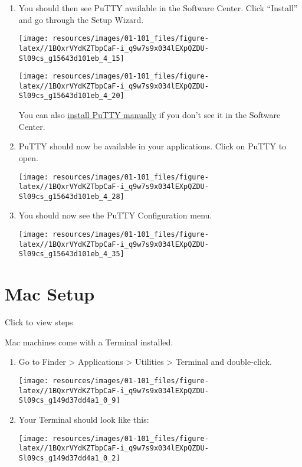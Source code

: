 \documentclass[
]{book}
\begin{document}
\begin{enumerate}
\def\labelenumi{\arabic{enumi}.}
\item
  You should then see PuTTY available in the Software Center. Click ``Install'' and go through the Setup Wizard.

  \texttt{[image: resources/images/01-101\_files/figure-latex//1BQxrVYdKZTbpCaF-i\_q9w7s9x034lEXpQZDU-Sl09cs\_g15643d101eb\_4\_15]}

  \texttt{[image: resources/images/01-101\_files/figure-latex//1BQxrVYdKZTbpCaF-i\_q9w7s9x034lEXpQZDU-Sl09cs\_g15643d101eb\_4\_20]}

  You can also \href{faq.html\#manual-putty}{install PuTTY manually} if you don't see it in the Software Center.
\item
  PuTTY should now be available in your applications. Click on PuTTY to open.

  \texttt{[image: resources/images/01-101\_files/figure-latex//1BQxrVYdKZTbpCaF-i\_q9w7s9x034lEXpQZDU-Sl09cs\_g15643d101eb\_4\_28]}
\item
  You should now see the PuTTY Configuration menu.

  \texttt{[image: resources/images/01-101\_files/figure-latex//1BQxrVYdKZTbpCaF-i\_q9w7s9x034lEXpQZDU-Sl09cs\_g15643d101eb\_4\_35]}
\end{enumerate}

\hypertarget{mac}{%
\section{Mac Setup}\label{mac}}

Click to view steps

Mac machines come with a Terminal installed.

\begin{enumerate}
\def\labelenumi{\arabic{enumi}.}
\item
  Go to Finder \textgreater{} Applications \textgreater{} Utilities \textgreater{} Terminal and double-click.

  \texttt{[image: resources/images/01-101\_files/figure-latex//1BQxrVYdKZTbpCaF-i\_q9w7s9x034lEXpQZDU-Sl09cs\_g149d37dd4a1\_0\_9]}
\item
  Your Terminal should look like this:

  \texttt{[image: resources/images/01-101\_files/figure-latex//1BQxrVYdKZTbpCaF-i\_q9w7s9x034lEXpQZDU-Sl09cs\_g149d37dd4a1\_0\_2]}
\end{enumerate}
\end{document}
